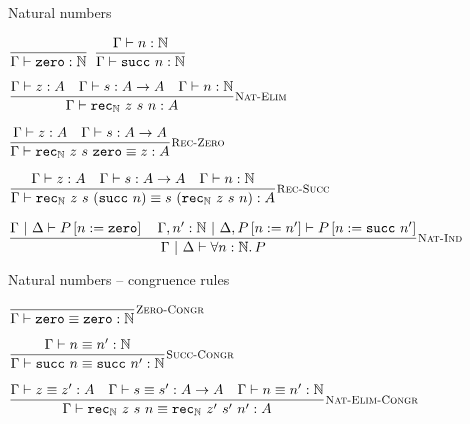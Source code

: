 \documentclass{beamer}
\begin{document}
\begin{frame}{Natural numbers}

\begin{center}
  $\infrule{}{\typing{\zero}{\Nat}}$ \quad
  $\infrule{\typing{n}{\Nat}}{\typing{\succ[n]}{\Nat}}$

  \vspace{2em}

  $\infrule[Nat-Elim]{\typing{z}{A} \quad \typing{s}{\Fun{A}{A}} \quad \typing{n}{\Nat}}{\typing{\natelim{z}{s}{n}}{A}}$

  \vspace{2em}

  $\infrule[Rec-Zero]{\typing{z}{A} \quad \typing{s}{\Fun{A}{A}}}{\compeq{\natelim{z}{s}{\zero}}{z}{A}}$

  \vspace{2em}

  $\infrule[Rec-Succ]{\typing{z}{A} \quad \typing{s}{\Fun{A}{A}} \quad \typing{n}{\Nat}}{\compeq{\natelim{z}{s}{(\succ[n])}}{\app{s}{(\natelim{z}{s}{n})}}{A}}$

  \vspace{2em}

  $\infrule[Nat-Ind]{\holds{\subst{P}{n}{\zero}} \quad \holds[\extend{\Gamma}{n'}{\Nat}][\assume{\Delta}{\subst{P}{n}{n'}}]{\subst{P}{n}{\succ[n']}}}{\holds{\All{n}[\Nat]{P}}}$
\end{center}

\end{frame}

\begin{frame}{Natural numbers -- congruence rules}

\begin{center}
  $\infrule[Zero-Congr]{}{\compeq{\zero}{\zero}{\Nat}}$

  \vspace{2em}

  $\infrule[Succ-Congr]{\compeq{n}{n'}{\Nat}}{\compeq{\succ[n]}{\succ[n']}{\Nat}}$

  \vspace{2em}

  $\infrule[Nat-Elim-Congr]{\compeq{z}{z'}{A} \quad \compeq{s}{s'}{\Fun{A}{A}} \quad \compeq{n}{n'}{\Nat}}{\compeq{\natelim{z}{s}{n}}{\natelim{z'}{s'}{n'}}{A}}$
\end{center}

\end{frame}

\newcommand{\List}[1]{\text{List}\ #1}
\newcommand{\nil}{\texttt{nil}}
\newcommand{\cons}[2]{\texttt{cons}\ #1\ #2}
\newcommand{\listelim}[3]{\texttt{fold}\ #1\ #2\ #3}
\end{document}
